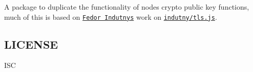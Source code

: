 \href{https://www.npmjs.org/package/browserify-sign}{\tt } \href{https://travis-ci.org/crypto-browserify/browserify-sign}{\tt } \href{https://david-dm.org/crypto-browserify/browserify-sign#info=dependencies}{\tt }

\href{https://github.com/feross/standard}{\tt }

A package to duplicate the functionality of node\textquotesingle{}s crypto public key functions, much of this is based on \href{https://github.com/indutny}{\tt Fedor Indutny\textquotesingle{}s} work on \href{https://github.com/indutny/tls.js}{\tt indutny/tls.\+js}.

\subsection*{L\+I\+C\+E\+N\+SE}

I\+SC 